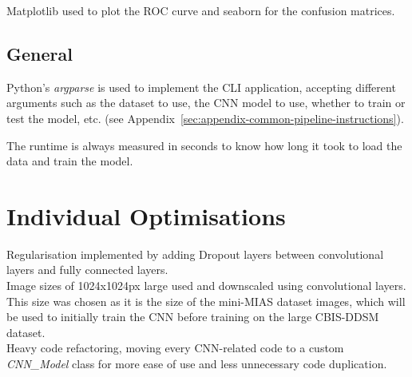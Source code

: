 Matplotlib used to plot the ROC curve and seaborn for the confusion matrices.


\subsection{General}

Python's \textit{argparse} is used to implement the CLI application, accepting different arguments such as the dataset to use, the CNN model to use, whether to train or test the model, etc. (see Appendix~\ref{sec:appendix-common-pipeline-instructions}).

The runtime is always measured in seconds to know how long it took to load the data and train the model.


\section{Individual Optimisations}

Regularisation implemented by adding Dropout layers between convolutional layers and fully connected layers.\\

Image sizes of 1024x1024px large used and downscaled using convolutional layers. This size was chosen as it is the size of the mini-MIAS dataset images, which will be used to initially train the CNN before training on the large CBIS-DDSM dataset.\\

Heavy code refactoring, moving every CNN-related code to a custom \textit{CNN\_Model} class for more ease of use and less unnecessary code duplication.




